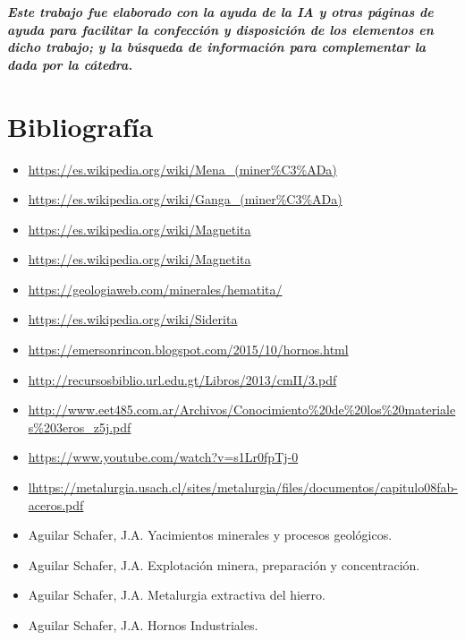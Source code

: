 \documentclass[12pt,a4paper]{article}
\begin{document}
\vfill
\textit{\textbf{Este trabajo fue elaborado con la ayuda de la IA y otras páginas de ayuda para facilitar la confección y disposición de los elementos en dicho trabajo; y la búsqueda de información para complementar la dada por la cátedra.}}

\newpage
\section{Bibliografía}
\begin{itemize}
    \item \url{https://es.wikipedia.org/wiki/Mena_(miner%C3%ADa)}
    \item \url{https://es.wikipedia.org/wiki/Ganga_(miner%C3%ADa)}
    \item \url{https://es.wikipedia.org/wiki/Magnetita}
    \item \url{https://es.wikipedia.org/wiki/Magnetita}
    \item \url{https://geologiaweb.com/minerales/hematita/}
    \item \url{https://es.wikipedia.org/wiki/Siderita}
    \item \url{https://emersonrincon.blogspot.com/2015/10/hornos.html}
    \item \url{http://recursosbiblio.url.edu.gt/Libros/2013/cmII/3.pdf}
    \item \url{http://www.eet485.com.ar/Archivos/Conocimiento%20de%20los%20materiales%203eros_z5j.pdf}
    \item \url{https://www.youtube.com/watch?v=s1Lr0fpTj-0}
    \item \url{lhttps://metalurgia.usach.cl/sites/metalurgia/files/documentos/capitulo08fab-aceros.pdf}
    \item Aguilar Schafer, J.A. Yacimientos minerales y procesos geológicos.
    \item Aguilar Schafer, J.A. Explotación minera, preparación y concentración.
    \item Aguilar Schafer, J.A. Metalurgia extractiva del hierro.
    \item Aguilar Schafer, J.A. Hornos Industriales.
\end{itemize}
\end{document}
